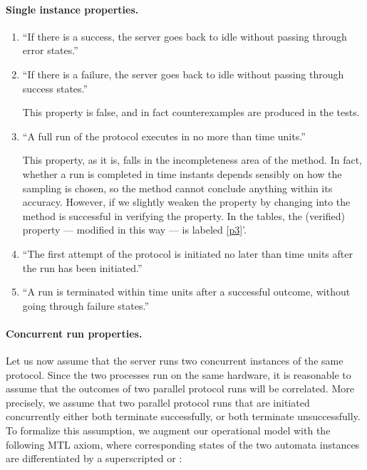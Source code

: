 \documentclass[a4paper]{article}
\theoremstyle{plain}
\theoremstyle{definition}
\begin{document}
\paragraph{Single instance properties.}
\begin{enumerate}
\item \label{p1}
  ``If there is a success, the server goes back to idle without passing through error states.''



\item \label{p2}
  ``If there is a failure, the server goes back to idle without passing through success states.''

   This property is false, and in fact counterexamples are produced in the tests.

\item \label{p3}
  ``A full run of the protocol executes in no more than  time units.''

  This property, as it is, falls in the incompleteness area of the method.
  In fact, whether a run is completed in  time instants depends sensibly on how the sampling is chosen, so the method cannot conclude anything within its accuracy.
  However, if we slightly weaken the property by changing  into  the method is successful in verifying the property.
  In the tables, the (verified) property --- modified in this way --- is labeled \ref{p3}'.

\item \label{p4}
  ``The first attempt of the protocol is initiated no later than  time units after the run has been initiated.''


\item \label{p5}
  ``A run is terminated within  time units after a successful outcome, without going through failure states.''

\end{enumerate}




\paragraph{Concurrent run properties.}
Let us now assume that the server runs two concurrent instances of the same protocol.
Since the two processes run on the same hardware, it is reasonable to assume that the outcomes of two parallel protocol runs will be correlated.
More precisely, we assume that two parallel protocol runs that are initiated concurrently either both terminate successfully, or both terminate unsuccessfully.
To formalize this assumption, we augment our operational model with the following MTL axiom, where corresponding states of the two automata instances are differentiated by a superscripted  or :
\end{document}

